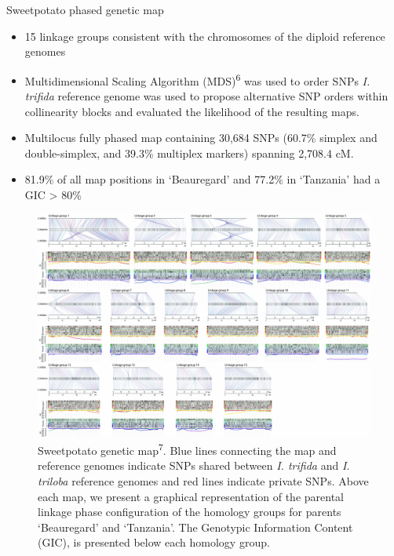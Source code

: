 \documentclass[final, 13pt]{beamer}
\newlength{\twocolwid}
\begin{document}
\begin{frame}[t]
\begin{columns}[t]
\begin{column}{\twocolwid}
\begin{block}{Sweetpotato phased genetic map}
  \begin{itemize}
  \item 15 linkage groups consistent with the chromosomes of the diploid reference genomes
  \item Multidimensional Scaling Algorithm (MDS)\textsuperscript{6} was used to order
    SNPs \textit{I. trifida} reference genome was used to propose alternative SNP orders within collinearity blocks and evaluated 
  the likelihood of the resulting maps.
  \item Multilocus fully phased map containing 30,684 SNPs (60.7\% simplex and double-simplex, and 39.3\% multiplex markers) spanning 2,708.4 cM.
  \item 81.9\% of all map positions in ‘Beauregard’ and 77.2\% in ‘Tanzania’ had a GIC > 80\%
  \end{itemize}
  \begin{figure}[htp]\label{fig:haplo}
    \includegraphics[width=.9\textwidth]{figures/final_map.jpg}
    \caption{\hspace{.01cm} Sweetpotato genetic map\textsuperscript{7}. Blue lines connecting the map and reference genomes indicate SNPs shared between \textit{I. trifida} and \textit{I. triloba} reference genomes and red lines indicate private SNPs. Above each map, we present a graphical representation of the parental linkage phase configuration of the homology groups for parents ‘Beauregard’ and ‘Tanzania’. The Genotypic Information Content (GIC), is presented below each homology group.}

\end{figure}
\end{block}
\end{column}
\end{columns}
\end{frame}
\end{document}
